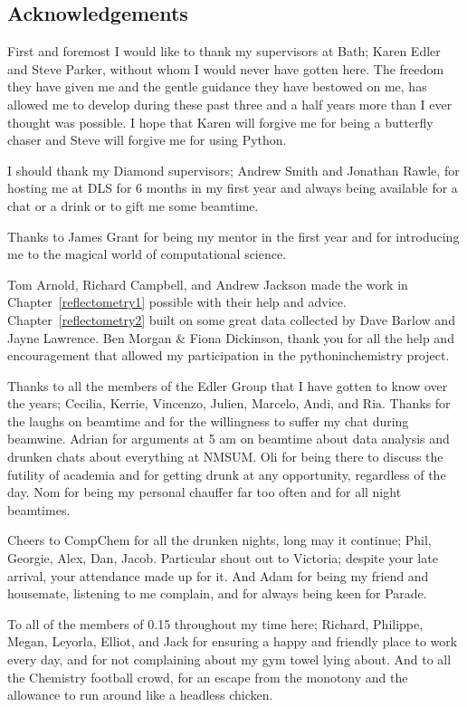 \documentclass[twoside,symmetric,nobib]{./arm-thesis}
\newcommand{\blankpage}{\newpage\hbox{}\thispagestyle{empty}\newpage}
\begin{document}
\blankpage
\begin{fullwidth}
\thispagestyle{empty}
\chapter*{Acknowledgements}

First and foremost I would like to thank my supervisors at Bath; Karen Edler and Steve Parker, without whom I would never have gotten here.
The freedom they have given me and the gentle guidance they have bestowed on me, has allowed me to develop during these past three and a half years more than I ever thought was possible.
I hope that Karen will forgive me for being a butterfly chaser and Steve will forgive me for using Python.

I should thank my Diamond supervisors; Andrew Smith and Jonathan Rawle, for hosting me at DLS for 6 months in my first year and always being available for a chat or a drink or to gift me some beamtime.

Thanks to James Grant for being my mentor in the first year and for introducing me to the magical world of computational science.

Tom Arnold, Richard Campbell, and Andrew Jackson made the work in Chapter~\ref{reflectometry1} possible with their help and advice. Chapter~\ref{reflectometry2} built on some great data collected by Dave Barlow and Jayne Lawrence. Ben Morgan \& Fiona Dickinson, thank you for all the help and encouragement that allowed my participation in the pythoninchemistry project.

Thanks to all the members of the Edler Group that I have gotten to know over the years; Cecilia, Kerrie, Vincenzo, Julien, Marcelo, Andi, and Ria. Thanks for the laughs on beamtime and for the willingness to suffer my chat during beamwine.
Adrian for arguments at 5 am on beamtime about data analysis and drunken chats about everything at NMSUM.
Oli for being there to discuss the futility of academia and for getting drunk at any opportunity, regardless of the day.
Nom for being my personal chauffer far too often and for all night beamtimes.

Cheers to CompChem for all the drunken nights, long may it continue; Phil, Georgie, Alex, Dan, Jacob.
Particular shout out to Victoria; despite your late arrival, your attendance made up for it.
And Adam for being my friend and housemate, listening to me complain, and for always being keen for Parade.

To all of the members of 0.15 throughout my time here; Richard, Philippe, Megan, Leyorla, Elliot, and Jack for ensuring a happy and friendly place to work every day, and for not complaining about my gym towel lying about. And to all the Chemistry football crowd, for an escape from the monotony and the allowance to run around like a headless chicken.
\vspace{\baselineskip}


\end{fullwidth}
\end{document}
